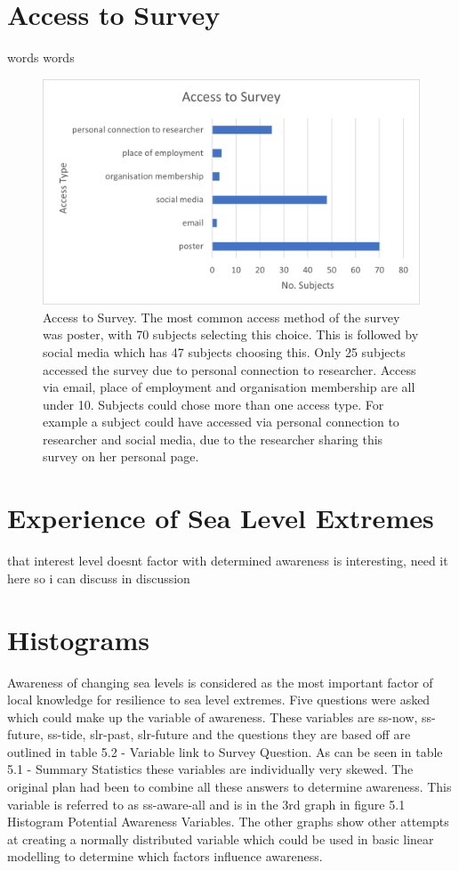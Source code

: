 \section{Access to Survey}
words words
\begin{figure}[h]
    \centering
    \includegraphics{fig_results/access_survey.png}
    \caption{Access to Survey. The most common access method of the survey was poster, with 70 subjects selecting this choice. This is followed by social media which has 47 subjects choosing this. Only 25 subjects accessed the survey due to personal connection to researcher. Access via email, place of employment and organisation membership are all under 10. Subjects could chose more than one access type. For example a subject could have accessed via personal connection to researcher and social media, due to the researcher sharing this survey on her personal page.}
    \label{fig:access_survey}
\end{figure}

\section{Experience of Sea Level Extremes}
that interest level doesnt factor with determined awareness is interesting, need it here so i can discuss in discussion 

\section{Histograms}
Awareness of changing sea levels is considered as the most important factor of local knowledge for resilience to sea level extremes. Five questions were asked which could make up the variable of awareness. These variables are ss-now, ss-future, ss-tide, slr-past, slr-future and the questions they are based off are outlined in table 5.2 - Variable link to Survey Question. As can be seen in table 5.1 - Summary Statistics these variables are individually very skewed. The original plan had been to combine all these answers to determine awareness. This variable is referred to as ss-aware-all and is in the 3rd graph in figure 5.1 Histogram Potential Awareness Variables. The other graphs show other attempts at creating a normally distributed variable which could be used in basic linear modelling to determine which factors influence awareness.

